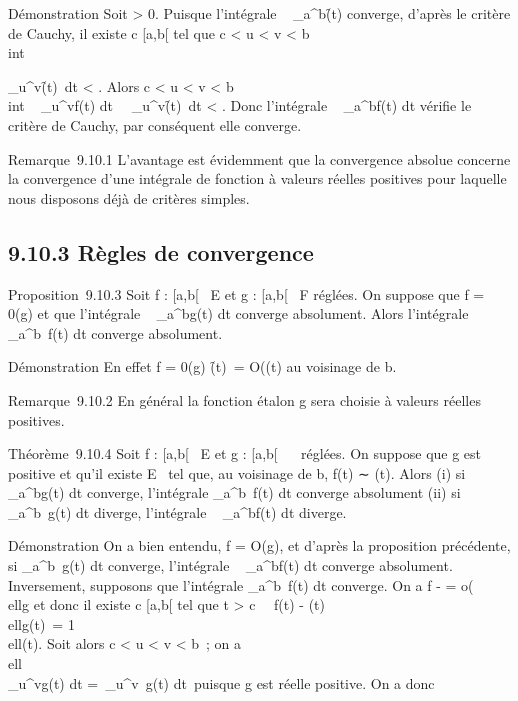 \documentclass[]{article}
\begin{document}
Démonstration Soit \epsilon > 0. Puisque l'intégrale
\int ~
_a^b\f(t)\dt
converge, d'après le critère de Cauchy, il existe c \in [a,b[ tel que
c < u < v < b \rigtharrow~\\int

_u^v\f(t)\
dt < \epsilon. Alors c < u < v < b
\rigtharrow~\\int ~
_u^vf(t) dt\
\leq\int ~
_u^v\f(t)\
dt < \epsilon. Donc l'intégrale \int ~
_a^bf(t) dt vérifie le critère de Cauchy, par conséquent
elle converge.

Remarque~9.10.1 L'avantage est évidemment que la convergence absolue
concerne la convergence d'une intégrale de fonction à valeurs réelles
positives pour laquelle nous disposons déjà de critères simples.

\subsection{9.10.3 Règles de convergence}

Proposition~9.10.3 Soit f : [a,b[\rightarrow~ E et g : [a,b[\rightarrow~ F réglées. On
suppose que f = 0(g) et que l'intégrale \int ~
_a^bg(t) dt converge absolument. Alors l'intégrale
\int  _a^b~f(t) dt converge
absolument.

Démonstration En effet f = 0(g) \Leftrightarrow
\f(t)\ =
O(\g(t)\) au voisinage
de b.

Remarque~9.10.2 En général la fonction étalon g sera choisie à valeurs
réelles positives.

Théorème~9.10.4 Soit f : [a,b[\rightarrow~ E et g : [a,b[\rightarrow~ ~ réglées. On
suppose que g est positive et qu'il existe \ell \in E
\diagdown\0\ tel que, au voisinage de b, f(t)
∼ \ellg(t). Alors (i) si \int ~
_a^bg(t) dt converge, l'intégrale
\int  _a^b~f(t) dt converge
absolument (ii) si \int  _a^b~g(t)
dt diverge, l'intégrale \int ~
_a^bf(t) dt diverge.

Démonstration On a bien entendu, f = O(g), et d'après la proposition
précédente, si \int  _a^b~g(t) dt
converge, l'intégrale \int ~
_a^bf(t) dt converge absolument. Inversement, supposons
que l'intégrale \int  _a^b~f(t) dt
converge. On a f - \ellg =
o(\\ellg\) et donc il
existe c \in [a,b[ tel que t > c
\rigtharrow~\ f(t) - \ellg(t)\ 
\\ellg(t)\ = 1
\over 2
\\ell\g(t). Soit alors c
< u < v < b~; on a
\\ell\\\int
 _u^vg(t) dt =\
\ell\int  _u^v~g(t)
dt\ puisque g est réelle positive. On a donc
\end{document}
